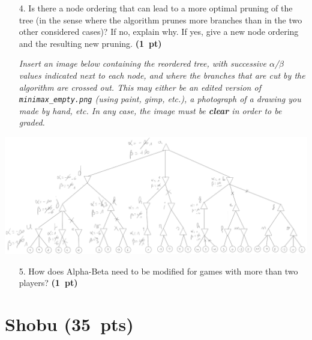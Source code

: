 \documentclass[11pt,a4paper]{report}
\begin{document}
\clearpage
\begin{enumerate}
\item[4.] Is there a node ordering that can lead to a more optimal pruning of the tree
(in the sense where the algorithm prunes more branches than in the two other
considered cases)? If no, explain why. If yes, give a new node ordering and the
resulting new pruning.  \textbf{(1~pt)}
      
      \textit{Insert an image below containing the reordered tree, with successive $\alpha$/$\beta$ values indicated next to each node, and where the branches that are cut by the algorithm are crossed out. This may either be an edited version of \texttt{minimax\_empty.png} (using paint, gimp, etc.), a photograph of a drawing you made by hand, etc. In any case, the image must be \textbf{clear} in order to be graded.}
\end{enumerate}

\begin{answers}[8cm]
\includegraphics[scale=.4]{images/optimal_ordering_q4.png}
\end{answers}




\begin{enumerate}
\item[5.] How does Alpha-Beta need to be modified for games with more than two players? \textbf{(1~pt)}
\end{enumerate}

\begin{answers}[9cm]
\end{answers}





\clearpage
\section{Shobu (35~pts)}
\medskip
\end{document}
